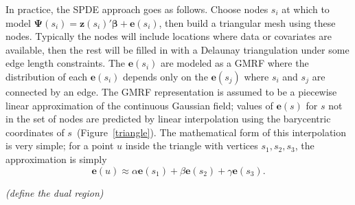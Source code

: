 \documentclass[]{interact}
\begin{document}
In practice, the SPDE approach goes as follows. Choose nodes \(s_{i}\)
at which to model \(\boldsymbol{\Psi}(s_{i})
= \mathbf{z}(s_{i})' \boldsymbol{\beta} + \mathbf{e}(s_{i})\), then build a
triangular mesh using these nodes. Typically the nodes will include locations
where data or covariates are available, then the rest will be filled in with a
Delaunay triangulation under some edge length constraints. The
\(\mathbf{e}(s_{i})\) are modeled as a GMRF where the distribution of
each \(\mathbf{e}(s_{i})\) depends only on the
\(\mathbf{e}(s_{j})\) where \(s_{i}\) and \(s_{j}\) are connected by an
edge. The GMRF representation is assumed to be a piecewise linear approximation
of the continuous Gaussian field; values of \(\mathbf{e}(s)\) for
\(s\) not in the set of nodes are predicted by linear interpolation using
the barycentric coordinates of \(s\)~(Figure~\ref{triangle}). The mathematical
form of this interpolation is very simple; for a point \(u\) inside the
triangle with vertices \(s_{1}, s_{2}, s_{3}\), the approximation is simply
\begin{displaymath}
\mathbf{e}(u) \approx \alpha \mathbf{e}(s_{1})
+ \beta \mathbf{e}(s_{2}) + \gamma \mathbf{e}(s_{3}).
\end{displaymath}


{\it (define the dual region)}

\end{document}
